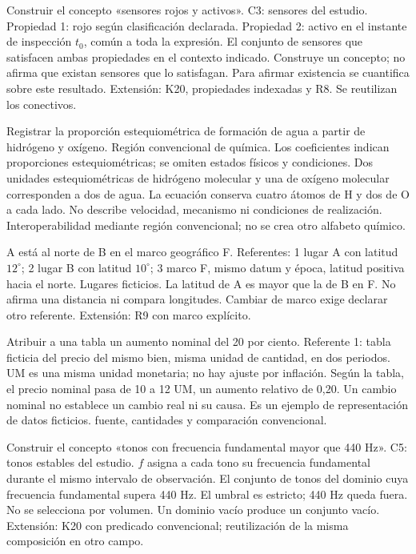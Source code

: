  {Construir el concepto «sensores rojos y activos».}
 {}
 {C3: sensores del estudio. Propiedad 1: rojo según clasificación declarada. Propiedad 2: activo en el instante de inspección \(t_0\), común a toda la expresión.}
 {El conjunto de sensores que satisfacen ambas propiedades en el contexto indicado.}
 {Construye un concepto; no afirma que existan sensores que lo satisfagan. Para afirmar existencia se cuantifica sobre este resultado.}
 {Extensión: K20, propiedades indexadas y R8. Se reutilizan los conectivos.}

 {Registrar la proporción estequiométrica de formación de agua a partir de hidrógeno y oxígeno.}
 {}
 {Región convencional de química. Los coeficientes indican proporciones estequiométricas; se omiten estados físicos y condiciones.}
 {Dos unidades estequiométricas de hidrógeno molecular y una de oxígeno molecular corresponden a dos de agua.}
 {La ecuación conserva cuatro átomos de H y dos de O a cada lado. No describe velocidad, mecanismo ni condiciones de realización.}
 {Interoperabilidad mediante región convencional; no se crea otro alfabeto químico.}

 {A está al norte de B en el marco geográfico F.}
 {}
 {Referentes: 1 lugar A con latitud \(12^\circ\); 2 lugar B con latitud \(10^\circ\); 3 marco F, mismo datum y época, latitud positiva hacia el norte. Lugares ficticios.}
 {La latitud de A es mayor que la de B en F.}
 {No afirma una distancia ni compara longitudes. Cambiar de marco exige declarar otro referente.}
 {Extensión: R9 con marco explícito.}

 {Atribuir a una tabla un aumento nominal del 20 por ciento.}
 {}
 {Referente 1: tabla ficticia del precio del mismo bien, misma unidad de cantidad, en dos periodos. UM es una misma unidad monetaria; no hay ajuste por inflación.}
 {Según la tabla, el precio nominal pasa de 10 a 12 UM, un aumento relativo de 0,20.}
 {Un cambio nominal no establece un cambio real ni su causa. Es un ejemplo de representación de datos ficticios.}
 {fuente, cantidades y comparación convencional.}

 {Construir el concepto «tonos con frecuencia fundamental mayor que 440 Hz».}
 {}
 {C5: tonos estables del estudio. \(f\) asigna a cada tono su frecuencia fundamental durante el mismo intervalo de observación.}
 {El conjunto de tonos del dominio cuya frecuencia fundamental supera 440 Hz.}
 {El umbral es estricto; 440 Hz queda fuera. No se selecciona por volumen. Un dominio vacío produce un conjunto vacío.}
 {Extensión: K20 con predicado convencional; reutilización de la misma composición en otro campo.}
